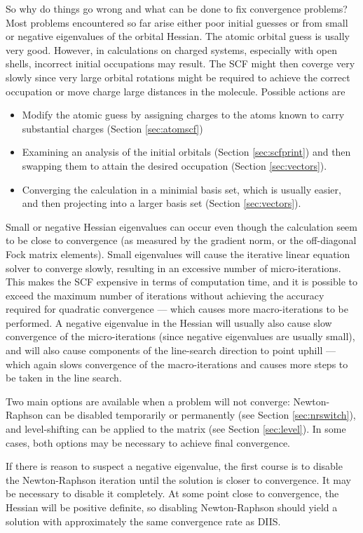 So why do things go wrong and what can be done to fix convergence
problems?  Most problems encountered so far arise either poor initial
guesses or from small or negative eigenvalues of the orbital Hessian.
The atomic orbital guess is usally very good.  However, in
calculations on charged systems, especially with open shells,
incorrect initial occupations may result.  The SCF might then coverge
very slowly since very large orbital rotations might be required to
achieve the correct occupation or move charge large distances in the
molecule.  Possible actions are
\begin{itemize}
\item Modify the atomic guess by assigning charges to the atoms
  known to carry substantial charges (Section \ref{sec:atomscf})
\item Examining an analysis of the initial orbitals (Section
  \ref{sec:scfprint}) and then swapping them to attain the desired
  occupation (Section \ref{sec:vectors}).
\item Converging the calculation in a minimial basis set, which is
  usually easier, and then projecting into a larger basis set (Section
  \ref{sec:vectors}).
\end{itemize}

Small or negative Hessian eigenvalues can occur even though the
calculation seem to be close to convergence (as measured by the
gradient norm, or the off-diagonal Fock matrix elements).  Small
eigenvalues will cause the iterative linear equation solver to
converge slowly, resulting in an excessive number of micro-iterations.
This makes the SCF expensive in terms of computation time, and it is
possible to exceed the maximum number of iterations without achieving
the accuracy required for quadratic convergence --- which causes more
macro-iterations to be performed.  A negative eigenvalue in the
Hessian will usually also cause slow convergence of the
micro-iterations (since negative eigenvalues are usually small), and
will also cause components of the line-search direction to point
uphill --- which again slows convergence of the macro-iterations and
causes more steps to be taken in the line search.

Two main options are available when a problem will not converge:
Newton-Raphson can be disabled temporarily or permanently (see Section
\ref{sec:nrswitch}), and level-shifting can be applied to the matrix
(see Section \ref{sec:level}).  In some cases, both options may be
necessary to achieve final convergence.

If there is reason to suspect a negative eigenvalue, the first course
is to disable the Newton-Raphson iteration until the solution is
closer to convergence.  It may be necessary to disable it completely.
At some point close to convergence, the Hessian will be positive
definite, so disabling Newton-Raphson should yield a solution with
approximately the same convergence rate as DIIS.

